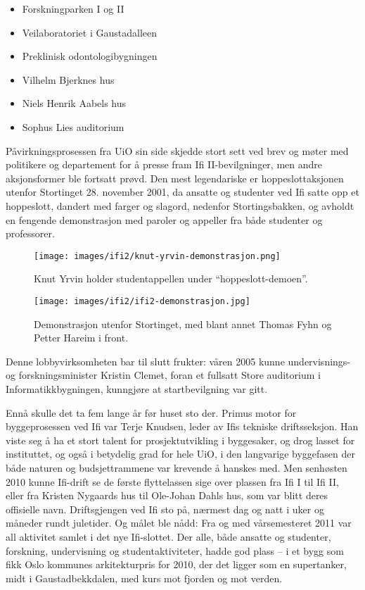 \begin{itemize}
	\item Forskningparken I og II
	\item Veilaboratoriet i Gaustadalleen
	\item Preklinisk odontologibygningen
	\item Vilhelm Bjerknes hus
	\item Niels Henrik Aabels hus
	\item Sophus Lies auditorium
\end{itemize}

Påvirkningsprosessen fra UiO sin side skjedde stort sett ved brev og møter med politikere og departement for å presse fram Ifi II-bevilgninger, men andre aksjonsformer ble fortsatt prøvd. Den mest legendariske er hoppeslottaksjonen utenfor Stortinget 28. november 2001, da ansatte og studenter ved Ifi satte opp et hoppeslott, dandert med farger og slagord, nedenfor Stortingsbakken, og avholdt en fengende demonstrasjon med paroler og appeller fra både studenter og professorer.

\begin{figure}
	\texttt{[image: images/ifi2/knut-yrvin-demonstrasjon.png]}
	\caption{Knut Yrvin holder studentappellen under ``hoppeslott-demoen''.}
\end{figure}

\begin{figure}
	\texttt{[image: images/ifi2/ifi2-demonstrasjon.jpg]}
	\caption{Demonstrasjon utenfor Stortinget, med blant annet Thomas Fyhn og Petter Hareim i front.}
\end{figure}

Denne lobbyvirksomheten bar til slutt frukter: våren 2005 kunne undervisnings- og forskningsminister Kristin Clemet, foran et fullsatt Store auditorium i Informatikkbygningen, kunngjøre at startbevilgning var gitt.

Ennå skulle det ta fem lange år før huset sto der. Primus motor for byggeprosessen ved Ifi var Terje Knudsen, leder av Ifis tekniske driftsseksjon. Han viste seg å ha et stort talent for prosjektutvikling i byggesaker, og drog lasset for instituttet, og også i betydelig grad for hele UiO, i den langvarige
byggefasen der både naturen og budsjettrammene var krevende å hanskes med. Men senhøsten 2010 kunne Ifi-drift se de første flyttelassen sige over plassen fra Ifi I til Ifi II, eller fra Kristen Nygaards hus til Ole-Johan Dahls hus, som var blitt deres offisielle navn. Driftsgjengen ved Ifi sto på,
nærmest dag og natt i uker og måneder rundt juletider. Og målet ble nådd: Fra og med vårsemesteret 2011 var all aktivitet samlet i det nye Ifi-slottet. Der alle, både ansatte og studenter, forskning, undervisning og studentaktiviteter, hadde god plass – i et bygg som fikk Oslo kommunes arkitekturpris for 2010, der det ligger som en supertanker, midt i Gaustadbekkdalen, med kurs mot fjorden og mot verden.

